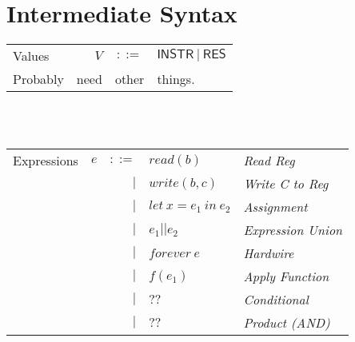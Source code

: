\documentclass[12pt, letterpaper]{article}
\begin{document}


\section{Intermediate Syntax}


    \begin{tabular}{l r c l}
        Values        & $V$     & $::=$     & $\mathsf{INSTR\ |\ RES}$\\
        Probably & need & other & things.
    \end{tabular}\\
    \\

    \begin{tabular}{l c r l l}
       Expressions  & $e$    & $::=$  & $read(b)$       & \textit{Read Reg}        \\
                    &        & $\mid$ & $write(b,c)$    & \textit{Write C to Reg}     \\
                    &        & $\mid$ & $let\ x = e_1\ in\ e_2$ & \textit{Assignment}        \\  
                    &        & $\mid$ & $e_1 || e_2$    & \textit{Expression Union}        \\  
                    &        & $\mid$ & $forever\ e$    & \textit{Hardwire}\\  
                    &        & $\mid$ & $f(e_1)$        & \textit{Apply Function} \\  
                    &        & $\mid$ & $??$            & \textit{Conditional} \\
                    &        & $\mid$ & $??$            & \textit{Product (AND)}
    \end{tabular}\\


\end{document}
